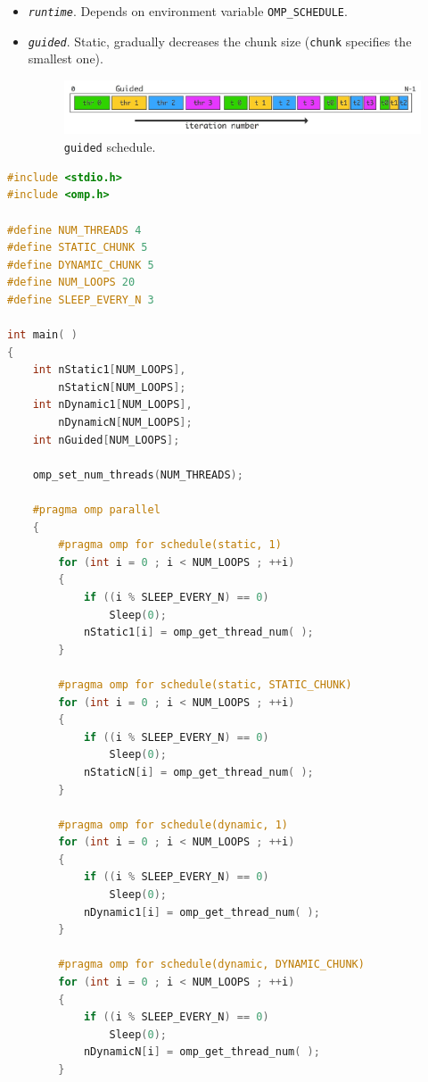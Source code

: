 \begin{itemize}
\begin{itemize}
        \item \texttt{\emph{runtime}}. Depends on environment variable \texttt{OMP\_SCHEDULE}.

        \item \texttt{\emph{guided}}. Static, gradually decreases the chunk size (\texttt{chunk} specifies the smallest one).
        \begin{figure}[!htp]
            \centering
            \includegraphics[width=\textwidth]{img/openmp-for-4.pdf}
            \caption{\texttt{guided} schedule.}
        \end{figure}
    \end{itemize}
    \newpage
    \begin{examplebox}
\begin{lstlisting}[language=C++]
#include <stdio.h>
#include <omp.h>

#define NUM_THREADS 4
#define STATIC_CHUNK 5
#define DYNAMIC_CHUNK 5
#define NUM_LOOPS 20
#define SLEEP_EVERY_N 3

int main( )
{
    int nStatic1[NUM_LOOPS],
        nStaticN[NUM_LOOPS];
    int nDynamic1[NUM_LOOPS],
        nDynamicN[NUM_LOOPS];
    int nGuided[NUM_LOOPS];

    omp_set_num_threads(NUM_THREADS);

    #pragma omp parallel
    {
        #pragma omp for schedule(static, 1)
        for (int i = 0 ; i < NUM_LOOPS ; ++i)
        {
            if ((i % SLEEP_EVERY_N) == 0)
                Sleep(0);
            nStatic1[i] = omp_get_thread_num( );
        }

        #pragma omp for schedule(static, STATIC_CHUNK)
        for (int i = 0 ; i < NUM_LOOPS ; ++i)
        {
            if ((i % SLEEP_EVERY_N) == 0)
                Sleep(0);
            nStaticN[i] = omp_get_thread_num( );
        }

        #pragma omp for schedule(dynamic, 1)
        for (int i = 0 ; i < NUM_LOOPS ; ++i)
        {
            if ((i % SLEEP_EVERY_N) == 0)
                Sleep(0);
            nDynamic1[i] = omp_get_thread_num( );
        }

        #pragma omp for schedule(dynamic, DYNAMIC_CHUNK)
        for (int i = 0 ; i < NUM_LOOPS ; ++i)
        {
            if ((i % SLEEP_EVERY_N) == 0)
                Sleep(0);
            nDynamicN[i] = omp_get_thread_num( );
        }


\end{lstlisting}
\end{examplebox}
\end{itemize}
